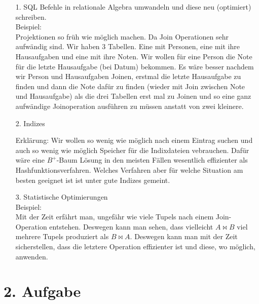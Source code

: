 \begin{enumerate}

\item[1.] 
SQL Befehle in relationale Algebra umwandeln und diese neu (optimiert) schreiben.\\

Beispiel: \\
Projektionen so früh wie möglich machen. Da Join Operationen sehr aufwändig sind.
Wir haben 3 Tabellen. Eine mit Personen, eine mit ihre Hausaufgaben und eine mit ihre Noten. Wir wollen für eine Person die Note für die letzte Hausaufgabe (bei Datum) bekommen.
Es wäre besser nachdem wir Person und Hausaufgaben Joinen, erstmal die letzte Hausaufgabe zu finden und dann die Note dafür zu finden (wieder mit Join zwischen Note und Hausaufgabe) als die drei Tabellen
erst mal zu Joinen und so eine ganz aufwändige Joinoperation ausführen zu müssen anstatt von zwei kleinere. 

\item[2.]
Indizes

Erklärung:
Wir wollen so wenig wie möglich nach einem Eintrag suchen und auch so wenig wie möglich Speicher für die Indixdateien vebrauchen. Dafür wäre eine $B^+$-Baum Lösung in den meisten Fällen wesentlich effizienter als Hashfunktionsverfahren. Welches Verfahren aber für welche Situation am besten geeignet ist ist unter gute Indizes gemeint.

\item[3.]
Statistische Optimierungen\\

Beispiel:\\
Mit der Zeit erfährt man, ungefähr wie viele Tupels nach einem Join-Operation entstehen. Deswegen kann man sehen, dass vielleicht $A \bowtie B$ viel mehrere Tupels produziert als
$B \bowtie A$. Deswegen kann man mit der Zeit sicherstellen, dass die letztere Operation effizienter ist und diese, wo möglich, anwenden.

\end{enumerate}

\section*{2. Aufgabe}

